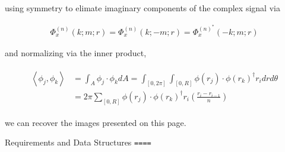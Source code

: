 \documentclass[11pt]{article}
\begin{document}
using symmetry to elimate imaginary components of the complex signal via 

\begin{align}
\Phi_x^{(n)}(k ; m ; r)=\Phi_x^{(n)}(k ;-m ; r)=\Phi_x^{(n)^*}(-k ; m ; r)
\end{align} 

and normalizing via the inner product,

\begin{align}
\begin{aligned}
\left\langle\phi_j, \phi_k\right\rangle & =\int_A \phi_j \cdot \phi_k d A=\int_{[0,2 \pi]} \int_{[0, R]} \phi\left(r_j\right) \cdot \phi\left(r_k\right)^{\dagger} r_i d r d \theta \\
& =2 \pi \sum_{[0, R]} \phi\left(r_j\right) \cdot \phi\left(r_k\right)^{\dagger} r_i\left(\frac{r_i-r_{i-1}}{n}\right)
\end{aligned}
\end{align} 

we can recover the images presented on this page.

Requirements and Data Structures
\texttt{====}
\end{document}
